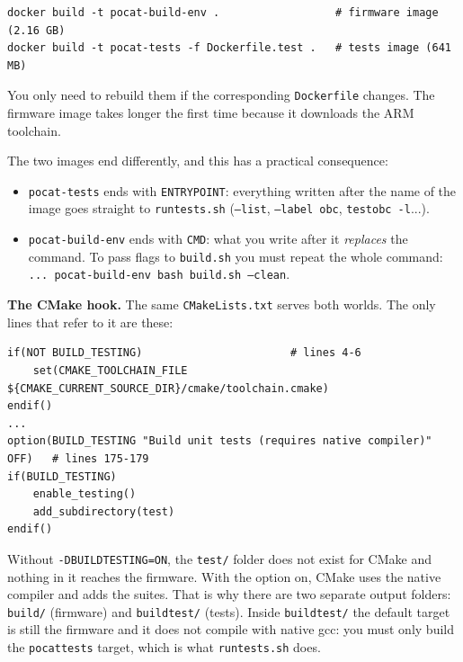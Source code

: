 \documentclass[11pt,a4paper]{article}
\DeclareRobustCommand{\_}{\textunderscore\allowbreak}
\newcommand{\cd}[1]{\texttt{#1}}
\begin{document}
\begin{lstlisting}
docker build -t pocat-build-env .                  # firmware image (2.16 GB)
docker build -t pocat-tests -f Dockerfile.test .   # tests image (641 MB)
\end{lstlisting}

You only need to rebuild them if the corresponding \cd{Dockerfile} changes. The firmware image takes
longer the first time because it downloads the ARM toolchain.

The two images end differently, and this has a practical consequence:
\begin{itemize}
\item \cd{pocat-tests} ends with \cd{ENTRYPOINT}: everything written after the name of
  the image goes straight to \cd{run\_tests.sh} (\cd{--list}, \cd{--label obc}, \cd{test\_obc -l}...).
\item \cd{pocat-build-env} ends with \cd{CMD}: what you write after it \emph{replaces}
  the command. To pass flags to \cd{build.sh} you must repeat the whole command:
  \cd{... pocat-build-env bash build.sh --clean}.
\end{itemize}

\textbf{The CMake hook.} The same \cd{CMakeLists.txt} serves both worlds. The
only lines that refer to it are these:
\begin{lstlisting}
if(NOT BUILD_TESTING)                       # lines 4-6
    set(CMAKE_TOOLCHAIN_FILE ${CMAKE_CURRENT_SOURCE_DIR}/cmake/toolchain.cmake)
endif()
...
option(BUILD_TESTING "Build unit tests (requires native compiler)" OFF)   # lines 175-179
if(BUILD_TESTING)
    enable_testing()
    add_subdirectory(test)
endif()
\end{lstlisting}
Without \cd{-DBUILD\_TESTING=ON}, the \cd{test/} folder does not exist for CMake and nothing in it
reaches the firmware. With the option on, CMake uses the native compiler and
adds the suites. That is why there are two separate output folders: \cd{build/}
(firmware) and \cd{build\_test/} (tests). Inside \cd{build\_test/} the default target
is still the firmware and it does not compile with native gcc: you must only build the
\cd{pocat\_tests} target, which is what \cd{run\_tests.sh} does.
\end{document}
